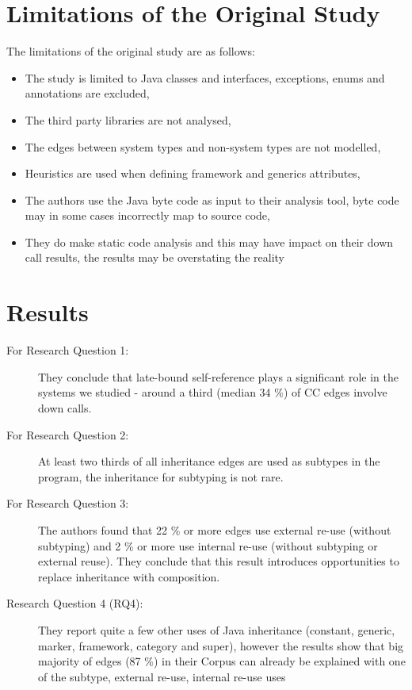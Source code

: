 \documentclass{uvamscse}
\begin{document}
\section{Limitations of the Original Study}
The limitations of the original study are as follows: 
\begin{itemize}
\item The study is limited to Java classes and interfaces, exceptions, enums and annotations are excluded,
\item The third party libraries are not analysed,
\item The edges between system types and non-system types are not modelled,
\item Heuristics are used when defining framework and generics attributes,
\item The authors use the Java byte code as input to their analysis tool, byte code may in some cases incorrectly map to source code,
\item They do make static code analysis and this may have impact on their down call results, the results may be overstating the reality
\end{itemize}



\section{Results}

\begin{description}
\item [For Research Question 1:] They conclude that late-bound self-reference plays a significant role in the systems we studied - around a third (median 34 \%) of CC edges involve down calls.

\item [For Research Question 2:] At least two thirds of all inheritance edges are used as subtypes in the program, the inheritance for subtyping is not rare.

\item[For Research Question 3:] The authors found that 22 \% or more edges use external re-use (without subtyping) and 2 \% or more use internal re-use (without subtyping or external reuse). They conclude that this result introduces opportunities to replace inheritance with composition. 


\item[Research Question 4 (RQ4):] They report quite a few other uses of Java inheritance (constant, generic, marker, framework, category and super), however the results show that big majority of edges (87 \%) in their Corpus can already be explained with one of the subtype, external re-use, internal re-use uses 

\end{description}
\end{document}
